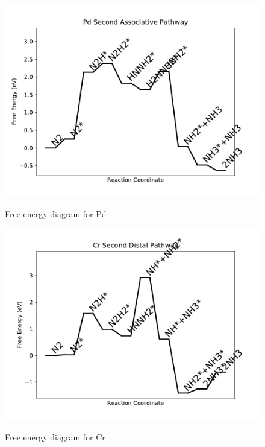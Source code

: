\documentclass{article}
\begin{document}
\begin{figure}
\includegraphics[width=1\linewidth]{data/plots/Pd_associative_2.pdf}
\label{fig:Pd_associative_2}
\caption{Free energy diagram for Pd}
\end{figure}

\begin{figure}
\includegraphics[width=1\linewidth]{data/plots/Cr_distal_2.pdf}
\label{fig:Cr_distal_2}
\caption{Free energy diagram for Cr}
\end{figure}
\end{document}
